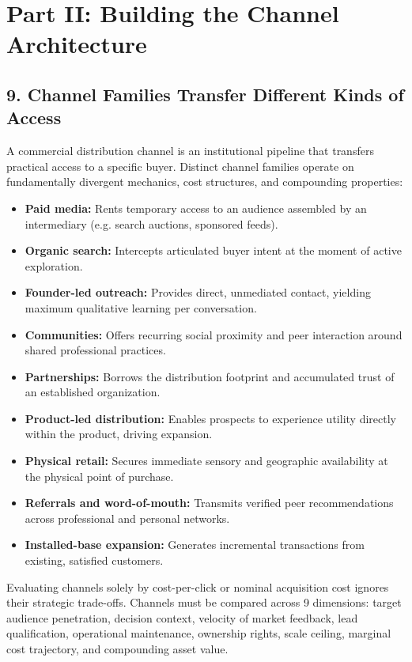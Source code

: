\section*{Part II: Building the Channel Architecture}

\subsection*{9. Channel Families Transfer Different Kinds of Access}

A commercial distribution channel is an institutional pipeline that transfers practical access to a specific buyer. Distinct channel families operate on fundamentally divergent mechanics, cost structures, and compounding properties:
\begin{itemize}[leftmargin=*,itemsep=1pt]
  \item \textbf{Paid media:} Rents temporary access to an audience assembled by an intermediary (e.g. search auctions, sponsored feeds).
  \item \textbf{Organic search:} Intercepts articulated buyer intent at the moment of active exploration.
  \item \textbf{Founder-led outreach:} Provides direct, unmediated contact, yielding maximum qualitative learning per conversation.
  \item \textbf{Communities:} Offers recurring social proximity and peer interaction around shared professional practices.
  \item \textbf{Partnerships:} Borrows the distribution footprint and accumulated trust of an established organization.
  \item \textbf{Product-led distribution:} Enables prospects to experience utility directly within the product, driving expansion.
  \item \textbf{Physical retail:} Secures immediate sensory and geographic availability at the physical point of purchase.
  \item \textbf{Referrals and word-of-mouth:} Transmits verified peer recommendations across professional and personal networks.
  \item \textbf{Installed-base expansion:} Generates incremental transactions from existing, satisfied customers.
\end{itemize}

Evaluating channels solely by cost-per-click or nominal acquisition cost ignores their strategic trade-offs. Channels must be compared across 9 dimensions: target audience penetration, decision context, velocity of market feedback, lead qualification, operational maintenance, ownership rights, scale ceiling, marginal cost trajectory, and compounding asset value.

